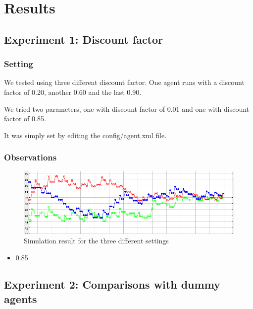 \documentclass[11pt]{article}
\begin{document}
\section{Results}

\subsection{Experiment 1: Discount factor}

\subsubsection{Setting}
We tested using three different discount factor. One agent runs with a
discount factor of 0.20, another 0.60 and the last 0.90.

We tried two parameters, one with discount factor of 0.01 and one with discount
factor of 0.85.

It was simply set by editing the config/agent.xml file.

\subsubsection{Observations}
\begin{figure}
  \caption{Simulation result for the three different settings}
  \includegraphics{compare_discount}
  \centering
\end{figure}

\begin{itemize}
	\item 0.85
\end{itemize}

\subsection{Experiment 2: Comparisons with dummy agents}
\end{document}
